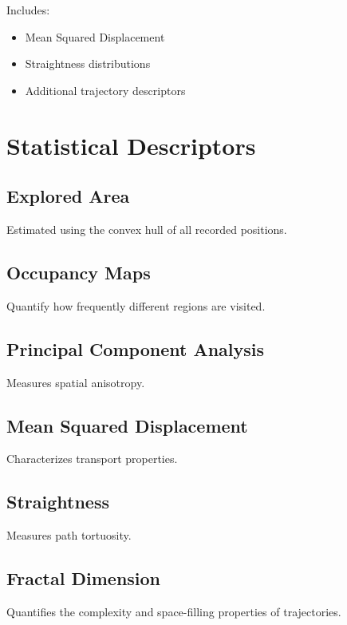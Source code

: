 \documentclass[11pt,a4paper]{article}
\begin{document}
Includes:

\begin{itemize}
\item Mean Squared Displacement
\item Straightness distributions
\item Additional trajectory descriptors
\end{itemize}

\section{Statistical Descriptors}



\subsection{Explored Area}

Estimated using the convex hull of all recorded positions.

\subsection{Occupancy Maps}

Quantify how frequently different regions are visited.

\subsection{Principal Component Analysis}

Measures spatial anisotropy.

\subsection{Mean Squared Displacement}

Characterizes transport properties.

\subsection{Straightness}

Measures path tortuosity.

\subsection{Fractal Dimension}

Quantifies the complexity and space-filling properties of trajectories.
\end{document}
